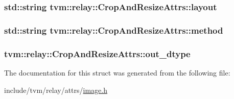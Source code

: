 \subsubsection[{\texorpdfstring{layout}{layout}}]{\setlength{\rightskip}{0pt plus 5cm}std\+::string tvm\+::relay\+::\+Crop\+And\+Resize\+Attrs\+::layout}\hypertarget{structtvm_1_1relay_1_1CropAndResizeAttrs_a3d8e178d59868617d4abed17fb002f31}{}\label{structtvm_1_1relay_1_1CropAndResizeAttrs_a3d8e178d59868617d4abed17fb002f31}
\subsubsection[{\texorpdfstring{method}{method}}]{\setlength{\rightskip}{0pt plus 5cm}std\+::string tvm\+::relay\+::\+Crop\+And\+Resize\+Attrs\+::method}\hypertarget{structtvm_1_1relay_1_1CropAndResizeAttrs_a4234e6ea86f6a7715d33bcfcb9171640}{}\label{structtvm_1_1relay_1_1CropAndResizeAttrs_a4234e6ea86f6a7715d33bcfcb9171640}
\subsubsection[{\texorpdfstring{out\+\_\+dtype}{out_dtype}}]{ tvm\+::relay\+::\+Crop\+And\+Resize\+Attrs\+::out\+\_\+dtype}\hypertarget{structtvm_1_1relay_1_1CropAndResizeAttrs_a956d7975f64d5ecb24db8962be4fad1d}{}\label{structtvm_1_1relay_1_1CropAndResizeAttrs_a956d7975f64d5ecb24db8962be4fad1d}


The documentation for this struct was generated from the following file\+:\begin{DoxyCompactItemize}
\item 
include/tvm/relay/attrs/\hyperlink{image_8h}{image.\+h}\end{DoxyCompactItemize}

